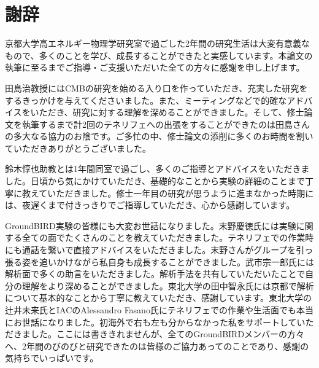 \chapter{謝辞}

京都大学高エネルギー物理学研究室で過ごした2年間の研究生活は大変有意義なもので、多くのことを学び、成長することができたと実感しています。本論文の執筆に至るまでご指導・ご支援いただいた全ての方々に感謝を申し上げます。

田島治教授にはCMBの研究を始める入り口を作っていただき、充実した研究をするきっかけを与えてくださいました。また、ミーティングなどで的確なアドバイスをいただき、研究に対する理解を深めることができました。そして、修士論文を執筆するまで計2回のテネリフェへの出張をすることができたのは田島さんの多大なる協力のお陰です。ご多忙の中、修士論文の添削に多くのお時間を割いていただきありがとうございました。

鈴木惇也助教とは1年間同室で過ごし、多くのご指導とアドバイスをいただきました。日頃から気にかけていただき、基礎的なことから実験の詳細のことまで丁寧に教えていただきました。修士一年目の研究が思うように進まなかった時期には、夜遅くまで付きっきりでご指導していただき、心から感謝しています。

GroundBIRD実験の皆様にも大変お世話になりました。末野慶徳氏には実験に関する全ての面でたくさんのことを教えていただきました。テネリフェでの作業時にも通話を繋いで直接アドバイスをいただきました。末野さんがグループを引っ張る姿を追いかけながら私自身も成長することができました。武市宗一郎氏には解析面で多くの助言をいただきました。解析手法を共有していただいたことで自分の理解をより深めることができました。東北大学の田中智永氏には京都で解析について基本的なことから丁寧に教えていただき、感謝しています。東北大学の辻井未来氏とIACのAlessandro Fasano氏にテネリフェでの作業や生活面でも本当にお世話になりました。初海外で右も左も分からなかった私をサポートしていただきました。ここには書ききれませんが、全てのGroundBIRDメンバーの方々へ、2年間のびのびと研究できたのは皆様のご協力あってのことであり、感謝の気持ちでいっぱいです。
